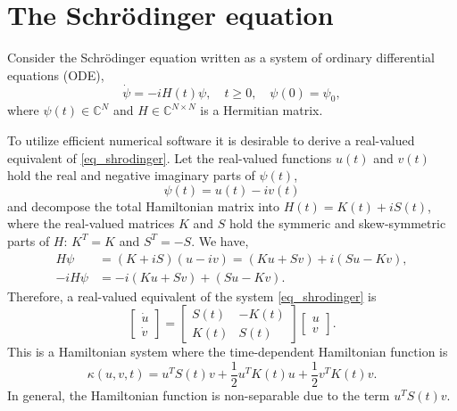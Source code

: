 \documentclass[11pt]{article}
\begin{document}



\section{The Schr\"odinger equation}
Consider the Schr\"odinger equation written as a system of ordinary differential equations (ODE),
\begin{equation}\label{eq_shrodinger}
\dot{\psi} = -i H(t) \psi,\quad t\geq 0,\quad \psi(0) = \psi_0,
\end{equation}
where $\psi(t)\in {\mathbb C}^N$ and $H\in {\mathbb C}^{N\times N}$ is a Hermitian matrix.

To utilize efficient numerical software it is desirable to derive a real-valued equivalent of
\eqref{eq_shrodinger}. Let the real-valued functions $u(t)$ and $v(t)$ hold the real and negative
imaginary parts of $\psi(t)$,
\[
\psi(t) = u(t) - iv(t)
\]
and decompose the total Hamiltonian matrix into $H(t) = K(t) + i S(t)$, where the real-valued
matrices $K$ and $S$ hold the symmeric and skew-symmetric parts of $H$: $K^T = K$ and $S^T =
-S$. We have,
\begin{align*}
H\psi &= (K+iS)(u - iv) = (Ku + Sv) + i(Su - Kv),\\
-iH\psi &= -i(Ku + Sv) + (Su - Kv).
\end{align*}
Therefore, a real-valued equivalent of the system \eqref{eq_shrodinger} is
\begin{equation}\label{eq_real-shrodinger}
  \begin{bmatrix} \dot{u}\\ \dot{v} \end{bmatrix} =
%
  \begin{bmatrix}
    S(t) & -K(t) \\ K(t) & S(t)
  \end{bmatrix}     
  \begin{bmatrix} u\\ v \end{bmatrix} .
\end{equation}
This is a Hamiltonian system where the time-dependent Hamiltonian function is
\begin{equation}\label{eq_hamiltonian}
\kappa(u,v,t) = u^T S(t) v + \frac{1}{2} u^T K(t) u + \frac{1}{2} v^T K(t) v.
\end{equation}
In general, the Hamiltonian function is non-separable due to the term $u^TS(t) v$.
\end{document}
